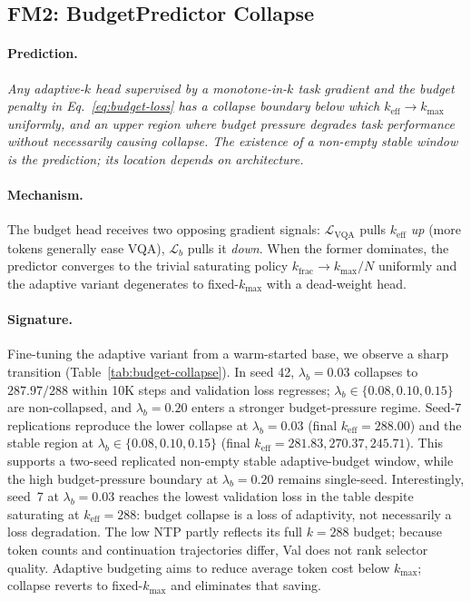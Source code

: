 \documentclass[runningheads]{llncs}
\newcommand{\keff}{k_{\mathrm{eff}}}
\newcommand{\kmax}{k_{\max}}
\newcommand{\lbb}{\lambda_b}
\newcommand{\Lvqa}{\mathcal{L}_{\mathrm{VQA}}}
\begin{document}
\subsection{FM2: BudgetPredictor Collapse}
\label{sec:fm2}

\paragraph{Prediction.}
\emph{Any adaptive-$k$ head supervised by a monotone-in-$k$ task gradient
and the budget penalty in Eq.~\ref{eq:budget-loss} has a
collapse boundary below which $\keff\!\to\!\kmax$ uniformly, and an
upper region where budget pressure degrades task performance without
necessarily causing collapse. The existence of a non-empty stable
window is the prediction; its location depends on architecture.}

\paragraph{Mechanism.}
The budget head receives two opposing gradient signals: $\Lvqa$ pulls
$\keff$ \emph{up} (more tokens generally ease VQA), $\mathcal{L}_b$ pulls
it \emph{down}. When the former dominates, the predictor converges to the
trivial saturating policy $k_\mathrm{frac}\!\to\!\kmax/N$ uniformly and
the adaptive variant degenerates to fixed-$\kmax$ with a dead-weight
head.

\paragraph{Signature.}
Fine-tuning the adaptive variant from a warm-started base, we observe a
sharp transition (Table~\ref{tab:budget-collapse}). In seed 42,
$\lbb{=}0.03$ collapses to $287.97/288$ within 10K steps and validation
loss regresses; $\lbb\in\{0.08,0.10,0.15\}$ are non-collapsed, and
$\lbb{=}0.20$ enters a stronger budget-pressure regime. Seed-7
replications reproduce the lower collapse at $\lbb{=}0.03$ (final
$\keff{=}288.00$) and the stable region at $\lbb\in\{0.08,0.10,0.15\}$
(final $\keff=281.83,270.37,245.71$). This supports a two-seed
replicated non-empty stable adaptive-budget window, while the high
budget-pressure boundary at $\lbb{=}0.20$ remains single-seed.
Interestingly, seed~7 at $\lbb{=}0.03$ reaches the lowest validation
loss in the table despite saturating at $\keff{=}288$: budget collapse
is a loss of adaptivity, not necessarily a loss degradation.
The low NTP partly reflects its full $k{=}288$ budget; because token
counts and continuation trajectories differ, Val does not rank selector
quality. Adaptive budgeting aims to reduce average token cost below
$\kmax$; collapse reverts to fixed-$\kmax$ and eliminates that saving.
\end{document}

